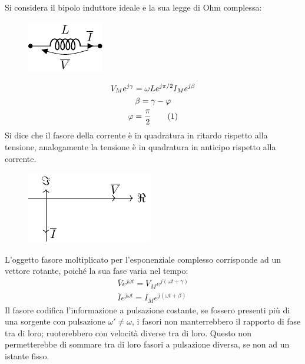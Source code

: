 \documentclass{article}
\newcommand{\tageq}{\tag{\stepcounter{equation}\theequation}}
\numberwithin{equation}{subsection}
\begin{document}
Si considera il bipolo induttore ideale e la sua legge di Ohm complessa:
\begin{figure}[H]%
    \centering
    \includegraphics{induttore-fasori.pdf}%
    \label{fig:induttore-fasori}
\end{figure}

\begin{gather*}
    V_Me^{j\gamma}=\omega Le^{j\pi/2}I_Me^{j\beta}\\
    \beta=\gamma-\varphi\\
    \varphi=\displaystyle\frac{\pi}{2}\tageq
\end{gather*}
Si dice che il fasore della corrente è in quadratura in ritardo rispetto alla tensione, analogamente la tensione è in quadratura in anticipo rispetto alla corrente.
\begin{figure}[H]%
    \centering
    \includegraphics{sfasamento-induttore.pdf}%
    \label{fig:sfasamento-induttore}
\end{figure}

L'oggetto fasore moltiplicato per l'esponenziale complesso corrisponde ad un vettore rotante, poiché la sua fase varia nel tempo:
\begin{gather*}
    \overline{V}e^{j\omega t}=V_Me^{j(\omega t+\gamma)}\\
    \overline Ie^{j\omega t}=I_Me^{j(\omega t+\beta)}
\end{gather*}
Il fasore codifica l'informazione a pulsazione costante, se fossero presenti più di una sorgente con pulsazione $\omega'\neq\omega$, i fasori non manterrebbero il rapporto di 
fase tra di loro; ruoterebbero con velocità diverse tra di loro. Questo non permetterebbe di sommare tra di loro fasori a pulsazione diversa, se non ad un istante fisso. 
\end{document}
